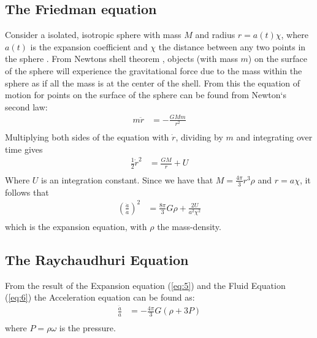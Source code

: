 \documentclass[a4paper, 11pt]{FSKH_623_Report}
\numberwithin{equation}{section}
\begin{document}
\subsection{The Friedman equation}
Consider a isolated, isotropic sphere with mass $M$ and radius $r=a(t)\chi$, where $a(t)$ is the expansion coefficient and $\chi$ the distance between any two points in the sphere \citep{notes4}. From Newtons shell theorem \citep{IronShell}, objects (with mass $m$) on the surface of the sphere will experience the gravitational force due to the mass within the sphere as if all the mass is at the center of the shell. From this the equation of motion for points on the surface of the sphere can be found from Newton`s second law:
\begin{equation}
\begin{split}
m\ddot{r} &= -\frac{GMm}{r^{2}}\\
\end{split}
\end{equation}
Multiplying both sides of the equation with $\dot{r}$, dividing by $m$ and integrating over time gives
\begin{equation}
\begin{split}
\frac{1}{2}\dot{r}^2 &= \frac{GM}{r}+U\\
\end{split}
\end{equation}
Where $U$ is an integration constant. Since we have that $M=\frac{4\pi}{3}r^{3}\rho$ and $r=a\chi$, it follows that
\begin{equation}\label{eq:5}
\begin{split}
\left(\frac{\dot{a}}{a}\right)^{2} &= \frac{8\pi}{3}G\rho+\frac{2U}{a^{2}\chi^{2}}\\
\end{split}
\end{equation}
which is the expansion equation, with $\rho$ the mass-density.
\subsection{The Raychaudhuri Equation}
From the result of the Expansion equation (\ref{eq:5}) and the Fluid Equation (\ref{eq:6}) the Acceleration equation can be found as:
\begin{equation}
\begin{split}
\frac{\ddot{a}}{a} &= -\frac{4\pi}{3}G\left(\rho +3P\right)\\
\end{split}
\end{equation}
where $P=\rho\omega$ is the pressure.
\end{document}
